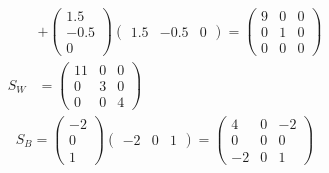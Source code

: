 \begin{align*}
  &+ \begin{pmatrix} 1.5\\ -0.5\\ 0\end{pmatrix} \begin{pmatrix} 1.5& -0.5& 0\end{pmatrix} = \begin{pmatrix} 9&0&0\\ 0&1&0\\ 0&0&0\end{pmatrix} \\
  S_W &= \begin{pmatrix} 11&0&0\\ 0&3&0\\ 0&0&4\end{pmatrix}
\end{align*}
\begin{align*}
  S_B = \begin{pmatrix} -2\\ 0\\ 1\end{pmatrix} \begin{pmatrix} -2& 0& 1\end{pmatrix} = \begin{pmatrix} 4&0&-2\\ 0&0&0\\ -2&0&1\end{pmatrix}
\end{align*}



